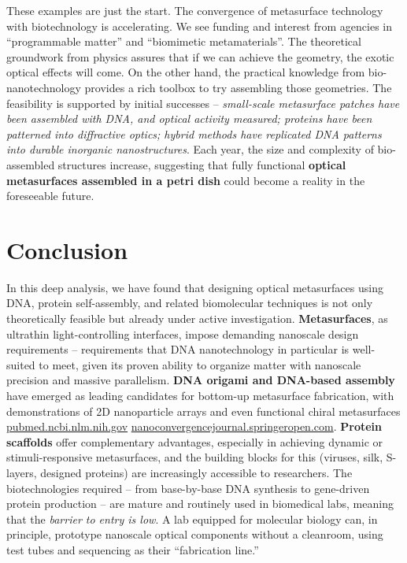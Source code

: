 \documentclass[11pt,a4paper]{article}
\begin{document}
These examples are just the start. The convergence of metasurface technology with biotechnology is accelerating. We see funding and interest from agencies in ``programmable matter'' and ``biomimetic metamaterials''. The theoretical groundwork from physics assures that if we can achieve the geometry, the exotic optical effects will come. On the other hand, the practical knowledge from bio-nanotechnology provides a rich toolbox to try assembling those geometries. The feasibility is supported by initial successes -- \emph{small-scale metasurface patches have been assembled with DNA, and optical activity measured; proteins have been patterned into diffractive optics; hybrid methods have replicated DNA patterns into durable inorganic nanostructures}. Each year, the size and complexity of bio-assembled structures increase, suggesting that fully functional \textbf{optical metasurfaces assembled in a petri dish} could become a reality in the foreseeable future.

\section{Conclusion}

In this deep analysis, we have found that designing optical metasurfaces using DNA, protein self-assembly, and related biomolecular techniques is not only theoretically feasible but already under active investigation. \textbf{Metasurfaces}, as ultrathin light-controlling interfaces, impose demanding nanoscale design requirements -- requirements that DNA nanotechnology in particular is well-suited to meet, given its proven ability to organize matter with nanoscale precision and massive parallelism. \textbf{DNA origami and DNA-based assembly} have emerged as leading candidates for bottom-up metasurface fabrication, with demonstrations of 2D nanoparticle arrays and even functional chiral metasurfaces \href{https://pubmed.ncbi.nlm.nih.gov/38859241/#:~:text=fabricated with top,of the suggested approach critically}{pubmed.ncbi.nlm.nih.gov} \href{https://nanoconvergencejournal.springeropen.com/articles/10.1186/s40580-020-00226-7#:~:text=metamaterials. A DNA,in handedness%2C color and intensity}{nanoconvergencejournal.springeropen.com}. \textbf{Protein scaffolds} offer complementary advantages, especially in achieving dynamic or stimuli-responsive metasurfaces, and the building blocks for this (viruses, silk, S-layers, designed proteins) are increasingly accessible to researchers. The biotechnologies required -- from base-by-base DNA synthesis to gene-driven protein production -- are mature and routinely used in biomedical labs, meaning that the \emph{barrier to entry is low}. A lab equipped for molecular biology can, in principle, prototype nanoscale optical components without a cleanroom, using test tubes and sequencing as their ``fabrication line.''
\end{document}
